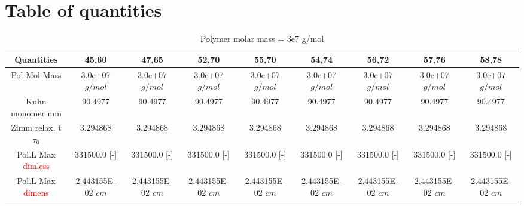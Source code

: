 \documentclass[]{article}
\begin{document}
\section{Table of quantities}
\begin{table}
 \centering
 \caption{Polymer molar mass = 3e7 g/mol}
\label{table1}
\begin{tabular}{ccccccccc}
\hline
\textbf{Quantities}& \textbf{45,60}& \textbf{47,65}& \textbf{52,70}& \textbf{55,70}& \textbf{54,74}& \textbf{56,72}& \textbf{57,76}& \textbf{58,78}\\ 
\hline

Pol Mol Mass& 3.0e+07 $g/mol$& 3.0e+07 $g/mol$& 3.0e+07 $g/mol$& 3.0e+07 $g/mol$& 3.0e+07 $g/mol$& 3.0e+07 $g/mol$& 3.0e+07 $g/mol$& 3.0e+07 $g/mol$\\ 

Kuhn monomer mm &  90.4977 &  90.4977 &  90.4977 &  90.4977 &  90.4977 &  90.4977 &  90.4977 &  90.4977\\ 
\hline

Zimm relax. t $\tau_0$ &   3.294868 &   3.294868 &   3.294868 &   3.294868 &   3.294868 &   3.294868 &   3.294868 &   3.294868\\ 
\hline

Pol.L Max \textcolor{red}{dimless} &   331500.0 [-] &   331500.0 [-] &   331500.0 [-] &   331500.0 [-] &   331500.0 [-] &   331500.0 [-] &   331500.0 [-] &   331500.0 [-]\\ 

Pol.L Max \textcolor{red}{dimens} &   2.443155E-02 $cm$ &   2.443155E-02 $cm$ &   2.443155E-02 $cm$ &   2.443155E-02 $cm$ &   2.443155E-02 $cm$ &   2.443155E-02 $cm$ &   2.443155E-02 $cm$ &   2.443155E-02 $cm$\\ 


\end{tabular}
\end{table}
\end{document}
